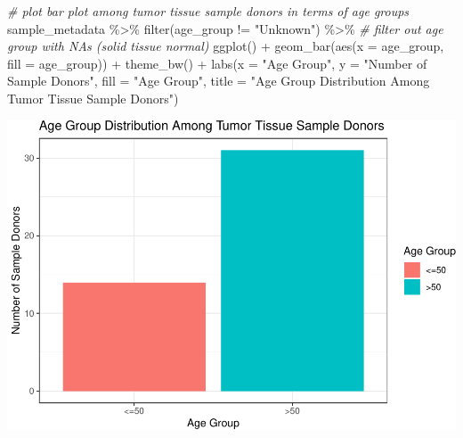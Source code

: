 \documentclass[
]{article}
\newenvironment{Shaded}{\begin{snugshade}}{\end{snugshade}}
\newcommand{\AttributeTok}[1]{\textcolor[rgb]{0.77,0.63,0.00}{#1}}
\newcommand{\CommentTok}[1]{\textcolor[rgb]{0.56,0.35,0.01}{\textit{#1}}}
\newcommand{\FunctionTok}[1]{\textcolor[rgb]{0.00,0.00,0.00}{#1}}
\newcommand{\NormalTok}[1]{#1}
\newcommand{\SpecialCharTok}[1]{\textcolor[rgb]{0.00,0.00,0.00}{#1}}
\newcommand{\StringTok}[1]{\textcolor[rgb]{0.31,0.60,0.02}{#1}}
\begin{document}
\begin{Shaded}
\begin{Highlighting}[]
\CommentTok{\# plot bar plot among tumor tissue sample donors in terms of age groups}
\NormalTok{sample\_metadata }\SpecialCharTok{\%\textgreater{}\%} 
  \FunctionTok{filter}\NormalTok{(age\_group }\SpecialCharTok{!=} \StringTok{"Unknown"}\NormalTok{) }\SpecialCharTok{\%\textgreater{}\%} \CommentTok{\# filter out age group with NAs (solid tissue normal)}
  \FunctionTok{ggplot}\NormalTok{() }\SpecialCharTok{+}
  \FunctionTok{geom\_bar}\NormalTok{(}\FunctionTok{aes}\NormalTok{(}\AttributeTok{x =}\NormalTok{ age\_group, }\AttributeTok{fill =}\NormalTok{ age\_group)) }\SpecialCharTok{+}
  \FunctionTok{theme\_bw}\NormalTok{() }\SpecialCharTok{+}
  \FunctionTok{labs}\NormalTok{(}\AttributeTok{x =} \StringTok{"Age Group"}\NormalTok{, }\AttributeTok{y =} \StringTok{"Number of Sample Donors"}\NormalTok{, }\AttributeTok{fill =} \StringTok{"Age Group"}\NormalTok{,}
       \AttributeTok{title =} \StringTok{"Age Group Distribution Among Tumor Tissue Sample Donors"}\NormalTok{)}
\end{Highlighting}
\end{Shaded}

\includegraphics{LiuKevin_Final_Project_files/figure-latex/unnamed-chunk-7-1.pdf}

\newpage
\end{document}

